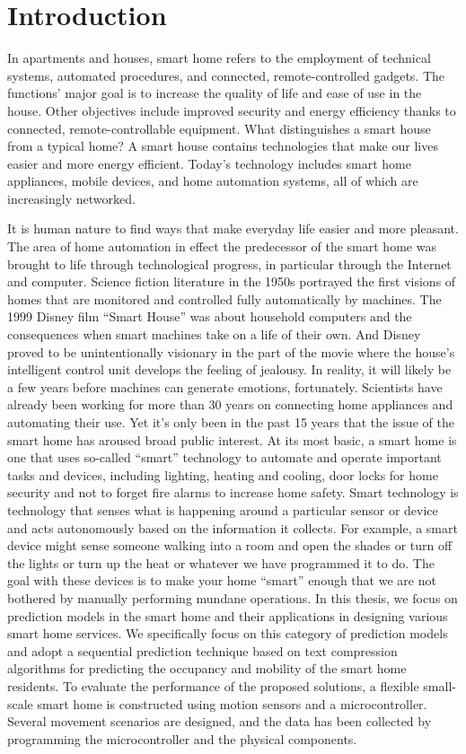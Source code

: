 \section{Introduction}
In apartments and houses, smart home refers to the employment of technical systems, automated procedures, and connected, remote-controlled gadgets. The functions' major goal is to increase the quality of life and ease of use in the house. Other objectives include improved security and energy efficiency thanks to connected, remote-controllable equipment. What distinguishes a smart house from a typical home? A smart house contains technologies that make our lives easier and more energy efficient. Today's technology includes smart home appliances, mobile devices, and home automation systems, all of which are increasingly networked.

It is human nature to find ways that make everyday life easier and more pleasant. The area of home automation in effect the predecessor of the smart home was brought to life through technological progress, in particular through the Internet and computer. Science fiction literature in the 1950s portrayed the first visions of homes that are monitored and controlled fully automatically by machines. The 1999 Disney film “Smart House” was about household computers and the consequences when smart machines take on a life of their own. And Disney proved to be unintentionally visionary in the part of the movie where the house’s intelligent control unit develops the feeling of jealousy. In reality, it will likely be a few years before machines can generate emotions, fortunately.
Scientists have already been working for more than 30 years on connecting home appliances and automating their use. Yet it’s only been in the past 15 years that the issue of the smart home has aroused broad public interest.
At its most basic, a smart home is one that uses so-called “smart” technology to automate and operate important tasks and devices, including lighting, heating and cooling, door locks for home security and not to forget fire alarms to increase home safety. Smart technology is technology that senses what is happening around a particular sensor or device and acts autonomously based on the information it collects. For example, a smart device might sense someone walking into a room and open the shades or turn off the lights or turn up the heat or whatever we have programmed it to do. The goal with these devices is to make your home “smart” enough that we are not bothered by manually performing mundane operations. In this thesis, we focus on prediction models in the smart home and their applications in designing various smart home services. We specifically focus on this category of prediction models and adopt a sequential prediction technique based on text compression algorithms for predicting the occupancy and mobility of the smart home residents. To evaluate the performance of the proposed solutions, a flexible small-scale smart home is constructed using motion sensors and a microcontroller. Several movement scenarios are designed, and the data has been collected by programming the microcontroller and the physical components.
